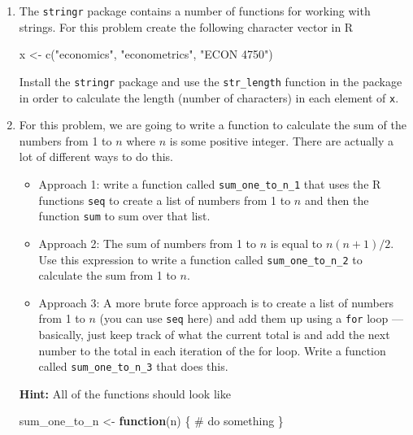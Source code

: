 \documentclass[
  letterpaper,
  DIV=11,
  numbers=noendperiod]{scrreprt}
\newenvironment{Shaded}{\begin{snugshade}}{\end{snugshade}}
\newcommand{\CommentTok}[1]{\textcolor[rgb]{0.37,0.37,0.37}{#1}}
\newcommand{\ControlFlowTok}[1]{\textcolor[rgb]{0.00,0.23,0.31}{\textbf{#1}}}
\newcommand{\FunctionTok}[1]{\textcolor[rgb]{0.28,0.35,0.67}{#1}}
\newcommand{\NormalTok}[1]{\textcolor[rgb]{0.00,0.23,0.31}{#1}}
\newcommand{\OtherTok}[1]{\textcolor[rgb]{0.00,0.23,0.31}{#1}}
\newcommand{\StringTok}[1]{\textcolor[rgb]{0.13,0.47,0.30}{#1}}
\begin{document}
\begin{enumerate}
\def\labelenumi{\arabic{enumi}.}
\item
  The \texttt{stringr} package contains a number of functions for
  working with strings. For this problem create the following character
  vector in R

\begin{Shaded}
\begin{Highlighting}[]
\NormalTok{x }\OtherTok{\textless{}{-}} \FunctionTok{c}\NormalTok{(}\StringTok{"economics"}\NormalTok{, }\StringTok{"econometrics"}\NormalTok{, }\StringTok{"ECON 4750"}\NormalTok{)}
\end{Highlighting}
\end{Shaded}

  Install the \texttt{stringr} package and use the \texttt{str\_length}
  function in the package in order to calculate the length (number of
  characters) in each element of \texttt{x}.
\item
  For this problem, we are going to write a function to calculate the
  sum of the numbers from 1 to \(n\) where \(n\) is some positive
  integer. There are actually a lot of different ways to do this.

  \begin{itemize}
  \item
    Approach 1: write a function called \texttt{sum\_one\_to\_n\_1} that
    uses the R functions \texttt{seq} to create a list of numbers from 1
    to \(n\) and then the function \texttt{sum} to sum over that list.
  \item
    Approach 2: The sum of numbers from 1 to \(n\) is equal to
    \(n(n+1)/2\). Use this expression to write a function called
    \texttt{sum\_one\_to\_n\_2} to calculate the sum from 1 to \(n\).\\
  \item
    Approach 3: A more brute force approach is to create a list of
    numbers from 1 to \(n\) (you can use \texttt{seq} here) and add them
    up using a \texttt{for} loop --- basically, just keep track of what
    the current total is and add the next number to the total in each
    iteration of the for loop. Write a function called
    \texttt{sum\_one\_to\_n\_3} that does this.
  \end{itemize}

  \textbf{Hint:} All of the functions should look like

\begin{Shaded}
\begin{Highlighting}[]
\NormalTok{sum\_one\_to\_n }\OtherTok{\textless{}{-}} \ControlFlowTok{function}\NormalTok{(n) \{}
  \CommentTok{\# do something}
\NormalTok{\}}
\end{Highlighting}
\end{Shaded}


\end{enumerate}
\end{document}
